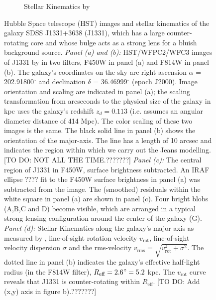 \begin{figure}
\begin{subfigure}{.5\textwidth}
  \caption{Stellar Kinematics by \citet{SWELLSV}}
  \label{fig:kinematics}
\end{subfigure}
\caption{Hubble Space telescope (HST) images and stellar kinematics of the galaxy SDSS J1331+3638 (J1331), which has a large counter-rotating core and whose bulge acts as a strong lens for a bluish background source. \emph{Panel (a) and (b):} HST/WFPC2/WFC3 images of J1331 by \citet{SWELLSI} in two filters, F450W in panel (a) and F814W in panel (b). The galaxy's coordinates on the sky are right ascension $\alpha$ = 202.91800$^\circ$ and declination $\delta$ = 36.46999$^\circ$ (epoch J2000). Image orientation and scaling are indicated in panel (a); the scaling transformation from arcseconds to the physical size of the galaxy in kpc uses the galaxy's redshift $z_d = 0.113$ \citep{SWELLSIII} (i.e. assumes an angular diameter distance of 414 Mpc). The color scaling of these two images is the same. The black solid line in panel (b) shows the orientation of the major-axis. The line has a length of 10 arcsec and indicates the region within which we carry out the Jeans modelling. [TO DO: NOT ALL THE TIME.???????] \emph{Panel (c):} The central region of J1331 in F450W, surface brightness subtracted. An IRAF ellipse ???? fit to the F450W surface brightness in panel (a) was subtracted from the image. The (smoothed) residuals within the white square in panel (a) are shown in panel (c). Four bright blobs (A,B,C and D) become visible, which are arranged in a typical strong lensing configuration around the center of the galaxy (G). \emph{Panel (d):} Stellar Kinematics along the galaxy's major axis as measured by \citet{SWELLSV}, line-of-sight rotation velocity $v_\text{rot}$, line-of-sight velocity dispersion $\sigma$ and the rms-velocity $v_\text{rms} = \sqrt{v_\text{rot}^2 + \sigma^2}$. The dotted line in panel (b) indicates the galaxy's effective half-light radius (in the F814W filter), $R_\text{eff} = 2.6" = 5.2$ kpc. The $v_\text{rot}$ curve reveals that J1331 is counter-rotating within $R_\text{eff}$. [TO DO: Add (x,y) axis in figure b).???????]}
\label{fig:specialJ1331}
\end{figure}